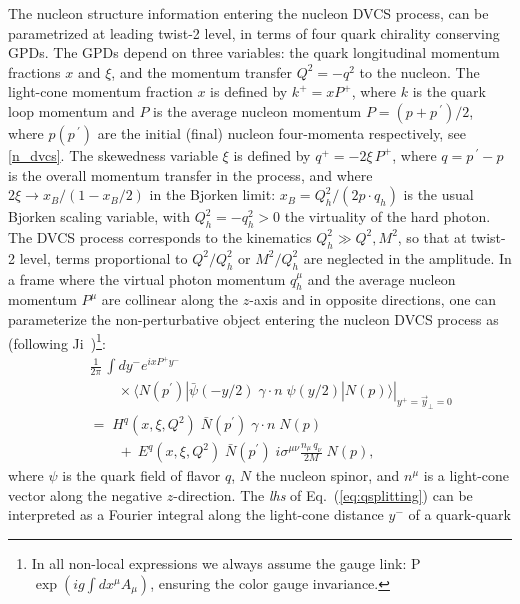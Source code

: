 \newline
\indent
The nucleon structure information entering the nucleon DVCS process, 
can be parametrized at leading twist-2 level, in
terms of four quark chirality conserving GPDs. 
The GPDs depend on three variables: the quark longitudinal 
momentum fractions $x$ and $\xi$, and the momentum transfer 
$Q^2 = - q^2$ to the nucleon.
The light-cone momentum fraction $x$ is defined by $k^+ = x P^+$,
where $k$ is the quark loop momentum and
$P$ is the average nucleon momentum 
$P = (p + p^{\ \prime})/2$, where $p (p^{\ \prime})$
are the initial (final) nucleon four-momenta respectively,  
see \ref{n_dvcs}.
The skewedness variable $\xi$ is
defined by $q^+ = - 2 \xi \,P^+$, where 
$q = p^{\ \prime} - p$ is the
overall momentum transfer in the process, and where
$2 \xi \rightarrow x_B/(1 - x_B/2)$ in the Bjorken limit: 
$x_B = Q_h^2/(2 p \cdot q_h)$ is the usual Bjorken scaling variable, 
with $Q_h^2 = -q_h^2 > 0$ the virtuality of the hard photon.
\newline
\indent
The DVCS process 
corresponds to the kinematics $Q_h^2 \gg Q^2, M^2$, 
so that at twist-2 level, terms proportional to $Q^2 / Q_h^2$ 
or $M^2 / Q_h^2$ are neglected in the amplitude.  
In a frame where the virtual photon momentum \( q_h^{\mu } \) and the average
nucleon momentum \(  P^{\mu } \) are collinear
along the \( z \)-axis and in opposite directions, one can parameterize
the non-perturbative object entering the nucleon DVCS process as 
(following Ji~\cite{ji})\footnote{In all non-local
expressions we always assume the gauge link:
P$\exp(ig\int dx^\mu A_\mu)$, ensuring the color gauge
invariance.}:
\begin{eqnarray}
&& \frac{1}{2\pi} \, \int dy^{-}e^{ix  P^{+}y^{-}}
		\nonumber\\
&& \qquad		\times
\left. \langle N(p^\prime)|\bar{\psi } (-y/2) \; \gamma \cdot n \; \psi (y/2)
| N(p) \rangle \right|_{y^{+}=\vec{y}_{\perp }=0} 
						\nonumber \\
&&=\; H^{q}(x,\xi ,Q^2)\; \bar{N}(p^{'}) \; \gamma \cdot n \; N(p)
						\nonumber\\
&& \qquad
+ \  E^{q}(x,\xi ,Q^2)\; \bar{N}(p^{'}) \; i\sigma^{\mu \nu} 
\frac{n_\mu \, q_\nu}{2 M} \; N(p) ,
\label{eq:qsplitting}
\end{eqnarray}
where \( \psi  \) is the quark field
of flavor $q$, \( N \) the nucleon spinor, and $n^\mu$ is a 
light-cone vector along the negative $z$-direction. 
The {\it lhs} of Eq.~(\ref{eq:qsplitting}) can be interpreted as a Fourier
integral along the light-cone distance $y^-$ of a quark-quark
